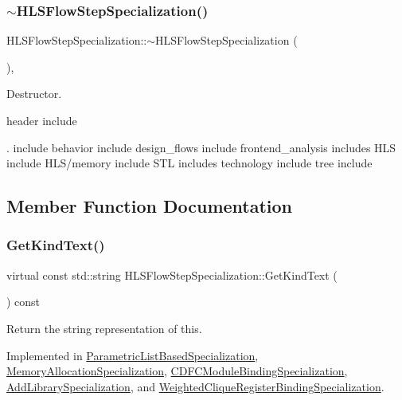 \subsubsection{\texorpdfstring{$\sim$\+H\+L\+S\+Flow\+Step\+Specialization()}{~HLSFlowStepSpecialization()}}
{\footnotesize\ttfamily H\+L\+S\+Flow\+Step\+Specialization\+::$\sim$\+H\+L\+S\+Flow\+Step\+Specialization (\begin{DoxyParamCaption}{ }\end{DoxyParamCaption})\hspace{0.3cm}{\ttfamily [virtual]}, {\ttfamily [default]}}



Destructor. 

header include

. include behavior include design\+\_\+flows include frontend\+\_\+analysis includes H\+LS include H\+L\+S/memory include S\+TL includes technology include tree include 

\subsection{Member Function Documentation}
\mbox{\label{classHLSFlowStepSpecialization_abcad0108fa726ac69986e26671a75ec3}} 
\subsubsection{\texorpdfstring{Get\+Kind\+Text()}{GetKindText()}}
{\footnotesize\ttfamily virtual const std\+::string H\+L\+S\+Flow\+Step\+Specialization\+::\+Get\+Kind\+Text (\begin{DoxyParamCaption}{ }\end{DoxyParamCaption}) const\hspace{0.3cm}{\ttfamily [pure virtual]}}



Return the string representation of this. 



Implemented in \hyperlink{classParametricListBasedSpecialization_a713bf4dc25984627ab7e0803f91510c2}{Parametric\+List\+Based\+Specialization}, \hyperlink{classMemoryAllocationSpecialization_a8c2ddfcb441998e471a3636503979657}{Memory\+Allocation\+Specialization}, \hyperlink{classCDFCModuleBindingSpecialization_a1696e824eb66cbcf6b94992c2bddf943}{C\+D\+F\+C\+Module\+Binding\+Specialization}, \hyperlink{classAddLibrarySpecialization_a456faa44646d3e8b63b8f77e11c88caa}{Add\+Library\+Specialization}, and \hyperlink{classWeightedCliqueRegisterBindingSpecialization_a988d2215af6d7303378ed138b33d93f7}{Weighted\+Clique\+Register\+Binding\+Specialization}.

